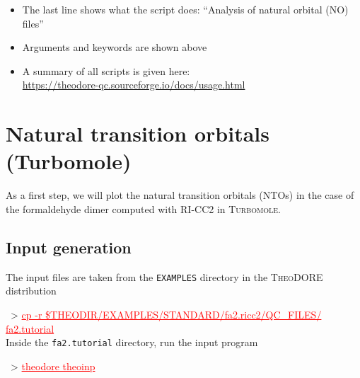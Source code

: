 \documentclass[DIV=12,headings=normal]{scrartcl}
\newcommand{\redl}[1]{{\textcolor{red}{\underline{#1}}}}
\newcommand{\comm}[1]{
\small
~> \redl{#1}
\normalsize
}
\newcommand{\theo}{\textsc{TheoDORE}}
\begin{document}
\begin{itemize}
\item The last line shows what the script does: ``Analysis of natural orbital (NO) files''
\item Arguments and keywords are shown above
\item A summary of all scripts is given here:\\
\url{https://theodore-qc.sourceforge.io/docs/usage.html}
\end{itemize}

\clearpage
\section{Natural transition orbitals (Turbomole)}

As a first step, we will plot the natural transition orbitals (NTOs) in the case of the formaldehyde dimer computed with RI-CC2 in \textsc{Turbomole}.

\subsection{Input generation}
\label{sec:inpnto}

The input files are taken from the \texttt{EXAMPLES} directory in the \theo{} distribution

\comm{cp -r \$THEODIR/EXAMPLES/STANDARD/fa2.ricc2/QC\_FILES/ fa2.tutorial} \\

Inside the \texttt{fa2.tutorial} directory, run the input program

\comm{theodore theoinp}
\end{document}
